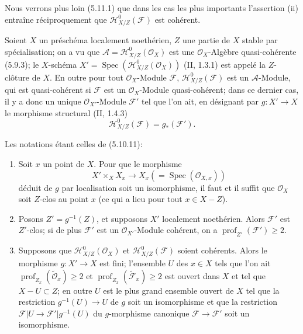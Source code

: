 Nous verrons plus loin (5.11.1) que dans les cas les plus importants
l'assertion (ii) entraîne réciproquement que
$\mathcal H^0_{X/Z}(\mathcal F)$ est cohérent.

\begin{env}[5.10.11]
\label{IV.2.s5.10.11-fr}
Soient $X$ un préschéma localement noethérien, $Z$ une partie de $X$ stable
par spécialisation; on a vu que
$\mathcal A=\mathcal H^0_{X/Z}(\mathcal O_X)$ est une
$\mathcal O_X$-Algèbre quasi-cohérente (5.9.3); le $X$-schéma
$X'=\operatorname{Spec}(\mathcal H^0_{X/Z}(\mathcal O_X))$ (II, 1.3.1) est
appelé la $Z$-clôture de $X$. En outre pour tout $\mathcal O_X$-Module
$\mathcal F$, $\mathcal H^0_{X/Z}(\mathcal F)$ est un $\mathcal A$-Module,
qui est quasi-cohérent si $\mathcal F$ est un $\mathcal O_X$-Module
quasi-cohérent; dans ce dernier cas, il y a donc un unique
$\mathcal O_{X'}$-Module $\mathcal F'$ tel que l'on ait, en désignant par
$g:X'\to X$ le morphisme structural (II, 1.4.3)
\begin{equation}
\mathcal H^0_{X/Z}(\mathcal F)=g_*(\mathcal F').
\tag{5.10.11.1}\label{IV.2.s5.10.11.1-fr}
\end{equation}
\end{env}

\begin{proposition}[5.10.12]
\label{IV.2.s5.10.12-fr}
Les notations étant celles de (5.10.11):
\begin{enumerate}
\item[(i)] Soit $x$ un point de $X$. Pour que le morphisme
\[
X'\times_X X_x\longrightarrow X_x(=\operatorname{Spec}(\mathcal O_{X,x}))
\]
déduit de $g$ par localisation soit un isomorphisme, il faut et il suffit que
$\mathcal O_X$ soit $Z$-clos au point $x$ (ce qui a lieu pour tout $x\in X-Z$).
\item[(ii)] Posons $Z'=g^{-1}(Z)$, et supposons $X'$ localement noethérien.
Alors $\mathcal F'$ est $Z'$-clos; si de plus $\mathcal F'$ est un
$\mathcal O_{X'}$-Module cohérent, on a
$\operatorname{prof}_{Z'}(\mathcal F')\geq2$.
\item[(iii)] Supposons que $\mathcal H^0_{X/Z}(\mathcal O_X)$ et
$\mathcal H^0_{X/Z}(\mathcal F)$ soient cohérents. Alors le morphisme
$g:X'\to X$ est fini; l'ensemble $U$ des $x\in X$ tels que l'on ait
$\operatorname{prof}_{Z_x}(\widetilde{\mathcal O}_x)\geq2$ et
$\operatorname{prof}_{Z_x}(\widetilde{\mathcal F}_x)\geq2$ est ouvert dans
$X$ et tel que $X-U\subset Z$; en outre $U$ est le plus grand ensemble ouvert
de $X$ tel que la restriction $g^{-1}(U)\to U$ de $g$ soit un isomorphisme et
que la restriction $\mathcal F|U\to\mathcal F'|g^{-1}(U)$ du $g$-morphisme
canonique $\mathcal F\to\mathcal F'$ soit un isomorphisme.
\end{enumerate}
\end{proposition}

